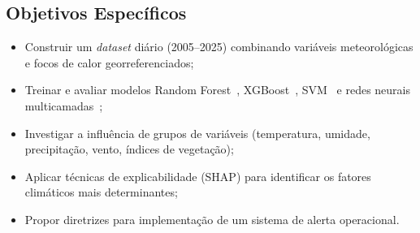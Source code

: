 \subsection{Objetivos Específicos}
\begin{itemize}
    \item Construir um \textit{dataset} diário (2005--2025) combinando variáveis meteorológicas e focos de calor georreferenciados;
    \item Treinar e avaliar modelos Random Forest~\cite{breiman2001randomForest}, XGBoost~\cite{chen2016xgboost}, SVM~\cite{cortes1995svm} e redes neurais multicamadas~\cite{rumelhart1986backprop};
    \item Investigar a influência de grupos de variáveis (temperatura, umidade, precipitação, vento, índices de vegetação);
    \item Aplicar técnicas de explicabilidade (SHAP) para identificar os fatores climáticos mais determinantes;
    \item Propor diretrizes para implementação de um sistema de alerta operacional.
\end{itemize}

